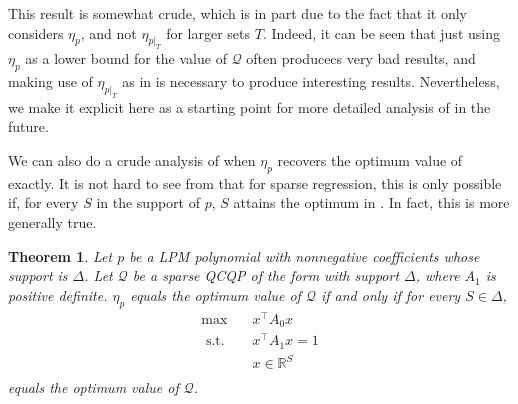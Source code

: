 \documentclass{amsart}
\newtheorem{theorem}{Theorem}[section]
\theoremstyle{definition}
\newcommand{\R}{\mathbb{R}}
\newcommand{\st}{{\text{ s.t. }}}
\begin{document}
This result is somewhat crude, which is in part due to the fact that it only considers $\eta_p$, and not $\eta_{p|_T}$ for larger sets $T$.
Indeed, it can be seen that just using $\eta_p$ as a lower bound for the value of $\mathcal{Q}$ often producecs very bad results, and making use of $\eta_{p|_T}$ as in  is necessary to produce interesting results.
Nevertheless, we make it explicit here as a starting point for more detailed analysis of  in the future.

We can also do a crude analysis of when $\eta_p$ recovers the optimum value of  exactly.
It is not hard to see from  that for sparse regression, this is only possible if, for every $S$ in the support of $p$, $S$ attains the optimum in .
In fact, this is more generally true.
\begin{theorem}
    Let $p$ be a LPM polynomial with nonnegative coefficients whose support is $\Delta$.
    Let $\mathcal{Q}$ be a sparse QCQP of the form  with support $\Delta$, where $A_1$ is positive definite.
    $\eta_p$ equals the optimum value of $\mathcal{Q}$ if and only if for every $S \in \Delta$,
    \begin{equation}
    \begin{aligned}
        \max\quad & x^{\intercal}A_0x\\
        \st & x^{\intercal}A_1x = 1\\
            & x \in \R^S\\
    \end{aligned}
    \end{equation}
    equals the optimum value of $\mathcal{Q}$.
\end{theorem}
\end{document}

